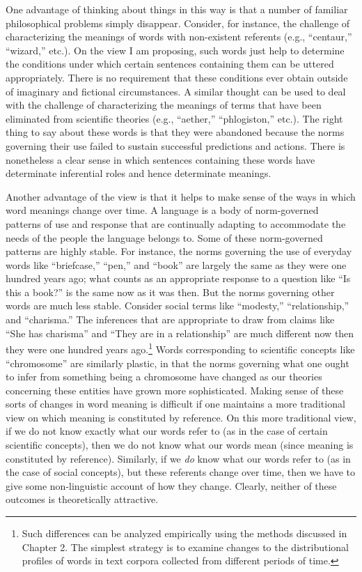 One advantage of thinking about things in this way is that a number of familiar philosophical problems simply disappear. Consider, for instance, the challenge of characterizing the meanings of words with non-existent referents (e.g., ``centaur,'' ``wizard,'' etc.). On the view I am proposing, such words just help to determine the conditions under which certain sentences containing them can be uttered appropriately. There is no requirement that these conditions ever obtain outside of imaginary and fictional circumstances. A similar thought can be used to deal with the challenge of characterizing the meanings of terms that have been eliminated from scientific theories (e.g., ``aether,'' ``phlogiston,'' etc.). The right thing to say about these words is that they were abandoned because the norms governing their use failed to sustain successful predictions and actions. There is nonetheless a clear sense in which sentences containing these words have determinate inferential roles and hence determinate meanings.

Another advantage of the view is that it helps to make sense of the ways in which word meanings change over time. A language is a body of norm-governed patterns of use and response that are continually adapting to accommodate the needs of the people the language belongs to. Some of these norm-governed patterns are highly stable. For instance, the norms governing the use of everyday words like ``briefcase,'' ``pen,'' and ``book'' are largely the same as they were one hundred years ago; what counts as an appropriate response to a question like ``Is this a book?'' is the same now as it was then. But the norms governing other words are much less stable. Consider social terms like ``modesty,'' ``relationship,'' and ``charisma.'' The inferences that are appropriate to draw from claims like ``She has charisma'' and ``They are in a relationship'' are much different now then they were one hundred years ago.\footnote{Such differences can be analyzed empirically using the methods discussed in Chapter 2. The simplest strategy is to examine changes to the distributional profiles of words in text corpora collected from different periods of time.} Words corresponding to scientific concepts like ``chromosome'' are similarly plastic, in that the norms governing what one ought to infer from something being a chromosome have changed as our theories concerning these entities have grown more sophisticated. Making sense of these sorts of changes in word meaning is difficult if one maintains a more traditional view on which meaning is constituted by reference. On this more traditional view, if we do not know exactly what our words refer to (as in the case of certain scientific concepts), then we do not know what our words mean (since meaning is constituted by reference). Similarly, if we \textit{do} know what our words refer to (as in the case of social concepts), but these referents change over time, then we have to give some non-linguistic account of how they change. Clearly, neither of these outcomes is theoretically attractive.  

